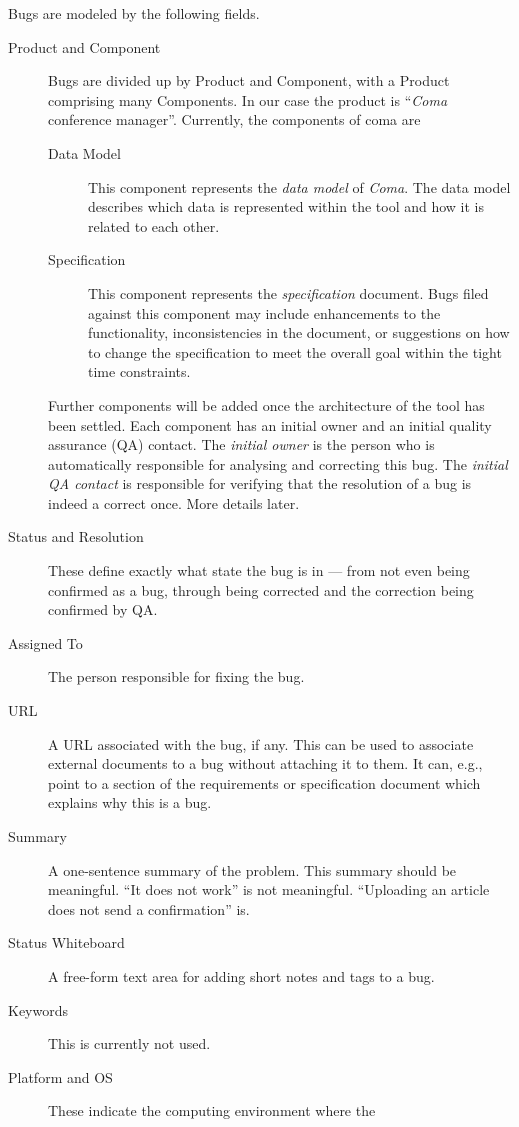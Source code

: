 \documentclass[11pt,handout]{handout}
\newcommand{\Coma}{\textsl{Coma}}
\begin{document}
Bugs are modeled by the following fields.
\begin{description}
\item[Product and Component]  Bugs are divided up by Product and Component,
  with a Product comprising many Components.  In our case the product is
  ``{\Coma} conference manager''.  Currently, the components of coma are
  \begin{description}
  \item[Data Model]  This component represents the \emph{data model} of
    {\Coma}.  The data model describes which data is represented within
    the tool and how it is related to each other.
  \item[Specification]  This component represents the \emph{specification}
    document.  Bugs filed against this component may include enhancements
    to the functionality, inconsistencies in the document, or suggestions
    on how to change the specification to meet the overall goal within the
    tight time constraints.
  \end{description}
  Further components will be added once the architecture of the tool has
  been settled.  Each component has an initial owner and an
  initial quality assurance (QA) contact.  The \emph{initial owner}
  is the person who is automatically responsible for analysing and
  correcting this bug.  The \emph{initial QA contact} is responsible
  for verifying that the resolution of a bug is indeed a correct once.
  More details later.
\item[Status and Resolution]  These define exactly what state the bug is in
  --- from not even being confirmed as a bug, through being corrected and
  the correction being confirmed by QA.
\item[Assigned To]  The person responsible for fixing the bug.
\item[URL] A URL associated with the bug, if any.  This can be used to
  associate external documents to a bug without attaching it to them.
  It can, e.g., point to a section of the requirements or specification
  document which explains why this is a bug.
\item[Summary] A one-sentence summary of the problem.  This summary should
  be meaningful.  ``It does not work'' is not meaningful.  ``Uploading an
  article does not send a confirmation'' is.
\item[Status Whiteboard]  A free-form text area for adding short notes and
  tags to a bug.
\item[Keywords]  This is currently not used.
\item[Platform and OS]  These indicate the computing environment where the

\end{description}
\end{document}

